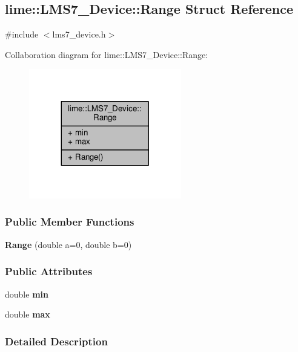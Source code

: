 \subsection{lime\+:\+:L\+M\+S7\+\_\+\+Device\+:\+:Range Struct Reference}
\label{structlime_1_1LMS7__Device_1_1Range}


{\ttfamily \#include $<$lms7\+\_\+device.\+h$>$}



Collaboration diagram for lime\+:\+:L\+M\+S7\+\_\+\+Device\+:\+:Range\+:
\nopagebreak
\begin{figure}[H]
\begin{center}
\leavevmode
\includegraphics[width=188pt]{d8/d55/structlime_1_1LMS7__Device_1_1Range__coll__graph}
\end{center}
\end{figure}
\subsubsection*{Public Member Functions}
\begin{DoxyCompactItemize}
\item 
{\bf Range} (double a=0, double b=0)
\end{DoxyCompactItemize}
\subsubsection*{Public Attributes}
\begin{DoxyCompactItemize}
\item 
double {\bf min}
\item 
double {\bf max}
\end{DoxyCompactItemize}


\subsubsection{Detailed Description}


